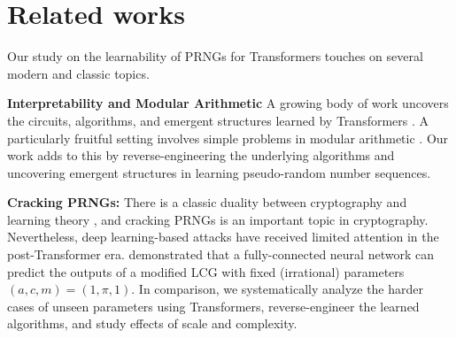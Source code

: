 \section{Related works}
Our study on the learnability of PRNGs for Transformers touches on several modern and classic topics. 



\textbf{Interpretability and Modular Arithmetic} A growing body of work uncovers the circuits, algorithms, and emergent structures learned by Transformers \cite{sharkey2025interp,olsson2022context,Ahn2023gradient,vonoswald2023Transformers,akyurek2023what,hendel2023incontext,liu2024incontextvector}. A particularly fruitful setting involves simple problems in modular arithmetic \cite{power2022grokking,gromov2022grokking,nanda2023progress,zhong2023clock,doshi2024to,he2024learning}.
Our work adds to this by reverse-engineering the underlying algorithms and uncovering emergent structures in learning pseudo-random number sequences. 


\textbf{Cracking PRNGs:} There is a classic duality between cryptography and learning theory \cite{rivest1991cryptography}, and cracking PRNGs is an important topic in cryptography. Nevertheless, deep learning-based attacks have received limited attention in the post-Transformer era. \citet{amigo2021} demonstrated that a fully-connected neural network can predict the outputs of a modified LCG with fixed (irrational) parameters $(a,c,m) = (1,\pi,1)$. In comparison, we systematically analyze the harder cases of unseen parameters using Transformers, reverse-engineer the learned algorithms, and study effects of scale and complexity. 

